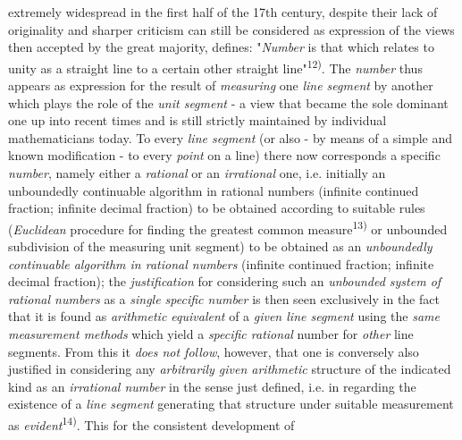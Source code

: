 \thispagestyle{fancy}

\vspace{0.5cm}

extremely widespread in the first half of the 17th century, despite their lack of originality and sharper criticism can still be considered as expression of the views then accepted by the great majority, defines: "\textit{Number} is that which relates to unity as a straight line to a certain other straight line"\textsuperscript{12)}. The \textit{number} thus appears as expression for the result of \textit{measuring} one \textit{line segment} by another which plays the role of the \textit{unit segment} - a view that became the sole dominant one up into recent times and is still strictly maintained by individual mathematicians today. To every \textit{line segment} (or also - by means of a simple and known modification - to every \textit{point} on a line) there now corresponds a specific \textit{number}, namely either a \textit{rational} or an \textit{irrational} one, i.e. initially an unboundedly continuable algorithm in rational numbers (infinite continued fraction; infinite decimal fraction) to be obtained according to suitable rules (\textit{Euclidean} procedure for finding the greatest common measure\textsuperscript{13)} or unbounded subdivision of the measuring unit segment) to be obtained as an \textit{unboundedly continuable algorithm in rational numbers} (infinite continued fraction; infinite decimal fraction); the \textit{justification} for considering such an \textit{unbounded system of rational numbers} as a \textit{single specific number} is then seen exclusively in the fact that it is found as \textit{arithmetic equivalent} of a \textit{given line segment} using the \textit{same measurement methods} which yield a \textit{specific rational} number for \textit{other} line segments. From this it \textit{does not follow}, however, that one is conversely also justified in considering any \textit{arbitrarily given arithmetic} structure of the indicated kind as an \textit{irrational number} in the sense just defined, i.e. in regarding the existence of a \textit{line segment} generating that structure under suitable measurement as \textit{evident}\textsuperscript{14)}. This for the consistent development of

